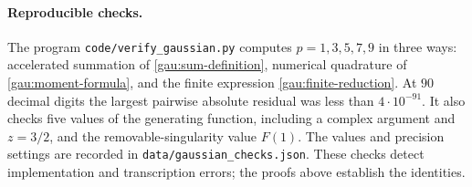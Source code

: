 \paragraph{Reproducible checks.}
The program \texttt{code/verify\_gaussian.py} computes $p=1,3,5,7,9$ in
three ways: accelerated summation of \eqref{gau:sum-definition}, numerical
quadrature of \eqref{gau:moment-formula}, and the finite expression
\eqref{gau:finite-reduction}. At $90$ decimal digits the largest pairwise
absolute residual was less than $4\cdot10^{-91}$. It also checks five
values of the generating function, including a complex argument and
$z=3/2$, and the removable-singularity value $F(1)$.
The values and precision settings are recorded in
\texttt{data/gaussian\_checks.json}. These checks detect implementation
and transcription errors; the proofs above establish the identities.
